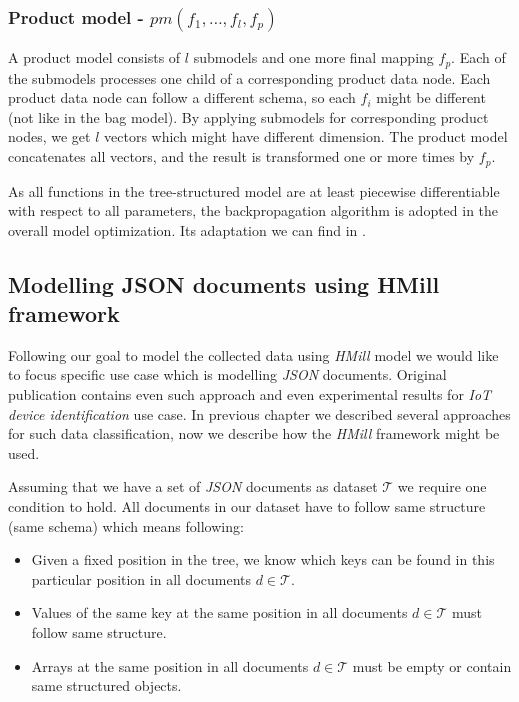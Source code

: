 \subsubsection{Product model - $pm(f_1,\dots,f_l,f_p)$}
A product model consists of $l$ submodels and one more final mapping $f_p$. Each of the submodels processes one child of a corresponding product data node. Each product data node can follow a different schema, so each $f_i$ might be different (not like in the bag model). By applying submodels for corresponding product nodes, we get $l$ vectors which might have different dimension. The product model concatenates all vectors, and the result is transformed one or more times by $f_p$.

As all functions in the tree-structured model are at least piecewise differentiable with respect to all parameters, the backpropagation algorithm is adopted in the overall model optimization. Its adaptation we can find in \cite{Mandlik2020}.



\subsection{Modelling JSON documents using HMill framework}
Following our goal to model the collected data using \emph{HMill} model we would like to focus specific use case which is modelling \emph{JSON} documents. Original publication \cite{Mandlik2020} contains even such approach and even experimental results for \emph{IoT device identification} use case. In previous chapter we described several approaches for such data classification, now we describe how the \emph{HMill} framework might be used.

Assuming that we have a set of \emph{JSON} documents as dataset $\mathcal{T}$ we require one condition to hold. All documents in our dataset have to follow same structure (same schema) which means following:
\begin{itemize}
    \item Given a fixed position in the tree, we know which keys can be found in this particular position in all documents $d\in\mathcal{T}$.
    \item Values of the same key at the same position in all documents $d\in\mathcal{T}$ must follow same structure.
    \item Arrays at the same position in all documents $d\in\mathcal{T}$ must be empty or contain same structured objects.
\end{itemize}

